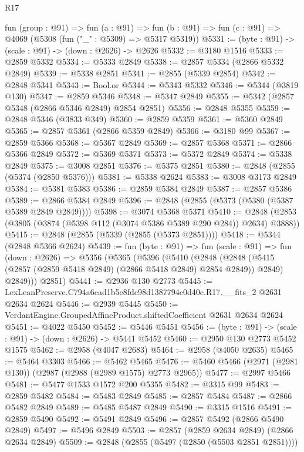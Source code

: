 \begin{lexlean}{R17}
\begin{coremodule}
  fun (group : @91) =>
  fun (a : @91) =>
  fun (b : @91) => fun (c : @91) => @4069 (@5308 (fun ("_" : @5309) => @5317 @5319))
@5331 := (byte : @91) -> (scale : @91) -> (down : @2626) -> @2626
@5332 := @3180 @1516
@5333 := @2859 @5332
@5334 := @5333 @2849
@5338 := @2857 @5334 (@2866 @5332 @2849)
@5339 := @5338 @2851
@5341 := @2855 (@5339 @2854)
@5342 := @2848 @5341
@5343 := Bool.or
@5344 := @5343 @5332
@5346 := @5344 (@3819 @130)
@5347 := @2859 @5346
@5348 := @5347 @2849
@5355 := @5342 (@2857 @5348 (@2866 @5346 @2849) @2854 @2851)
@5356 := @2848 @5355
@5359 := @2848 @5346 (@3833 @349)
@5360 := @2859 @5359
@5361 := @5360 @2849
@5365 := @2857 @5361 (@2866 @5359 @2849)
@5366 := @3180 @99
@5367 := @2859 @5366
@5368 := @5367 @2849
@5369 := @2857 @5368
@5371 := @2866 @5366 @2849
@5372 := @5369 @5371
@5373 := @5372 @2849
@5374 := @5338 @2849
@5375 := @3008 @2851
@5376 := @5375 @2851
@5380 := @2848 (@2855 (@5374 (@2850 @5376)))
@5381 := @5338 @2624
@5383 := @3008 @3173 @2849
@5384 := @5381 @5383
@5386 := @2859 @5384 @2849
@5387 := @2857 @5386
@5389 := @2866 @5384 @2849
@5396 := @2848 (@2855 (@5373 (@5380 (@5387 @5389 @2849 @2849))))
@5398 := @3074 @5368 @5371
@5410 := @2848 (@2853 (@3805 (@3874 (@5398 @112 (@3074 @5386 @5389 @290 @284)) @2634) @3888))
@5415 := @2848 (@2855 (@5339 (@2855 (@5373 @2851))))
@5418 := @5344 (@2848 @5366 @2624)
@5439 := fun (byte : @91) =>
  fun (scale : @91) =>
  fun (down : @2626) =>
  @5356
    (@5365
      (@5396
        (@5410
          (@2848
            (@2848 (@5415 (@2857 (@2859 @5418 @2849) (@2866 @5418 @2849) @2854 @2849)) @2849)
            @2849)))
      @2851)
@5441 := @2936 @130 @2773
@5445 := LexLeanPreserve.C794a6cad1b5e8fdc98d1387794c0d40c.R17.__fits_2 @2631 @2634 @2624
@5446 := @2939 @5445
@5450 := VerdantEngine.GroupedAffineProduct.shiftedCoefficient @2631 @2634 @2624
@5451 := @4022 @5450
@5452 := @5446 @5451
@5456 := (byte : @91) -> (scale : @91) -> (down : @2626) -> @5441 @5452
@5460 := @2950 @130 @2773 @5452 @1575
@5462 := @2958 (@4047 @2683)
@5464 := @2958 (@4050 @2635)
@5465 := @5464 @3303
@5466 := @5462 @5465
@5476 := @5460 @5466 (@2971 (@2981 @130)) (@2987 (@2988 (@2989 @1575) @2773 @2965))
@5477 := @2997 @5466
@5481 := @5477 @1533 @1572 @200 @5355
@5482 := @3315 @99
@5483 := @2859 @5482
@5484 := @5483 @2849
@5485 := @2857 @5484
@5487 := @2866 @5482 @2849
@5489 := @5485 @5487 @2849
@5490 := @3315 @1516
@5491 := @2859 @5490
@5492 := @5491 @2849
@5496 := @2857 @5492 (@2866 @5490 @2849)
@5497 := @5496 @2849
@5503 := @2857 (@2859 @2634 @2849) (@2866 @2634 @2849)
@5509 := @2848 (@2855 (@5497 (@2850 (@5503 @2851 @2851))))

\end{coremodule}
\end{lexlean}
